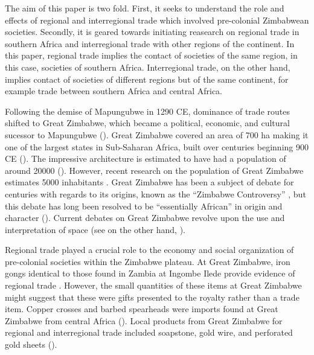 The aim of this paper is two fold. First, it seeks to understand the role and effects of regional and interregional trade which involved pre-colonial Zimbabwean societies. Secondly, it is geared towards initiating reasearch on regional trade in southern Africa and interregional trade with other regions of the continent. In this paper, regional trade implies the contact of societies of the same region, in this case, societies of southern Africa. Interregional trade, on the other hand, implies contact of societies of different regions but of the same continent, for example trade between southern Africa and central Africa.


Following the demise of Mapungubwe in 1290 CE, dominance of trade routes shifted to Great Zimbabwe, which became a political, economic, and cultural sucessor to Mapungubwe (\cites{pikirayi1993}{pwiti2005}{manyanga2006}). Great Zimbabwe covered an area of 700 ha making it one of the largest states in Sub-Saharan Africa, built over centuries beginning 900 CE (\cites{sinclair1993}{ndoro1997}{ndoro2001}).
The impressive architecture is estimated to have had a population of around \num{20000} (\cites{garlake1973}{hall1990}{kim2008}). However, recent research on the population of Great Zimbabwe estimates 5000 inhabitants \parencite{chirikure2017}.
Great Zimbabwe has been a subject of debate for centuries with regards to its origins, known as the \enquote{Zimbabwe Controversy} \parencite{tangri1990},
but this debate has long been resolved to be \enquote{essentially African} in origin and character (\cites{randall1906}{ndoro1997}). Current debates on Great Zimbabwe revolve upon the use and interpretation of space
(see \cites{huffman1984a}{huffman1984b}{huffman1996}{huffman2010}{huffman2014}
on the other hand, \cites{beach1998}{chirikure2008}{pikirayi2011}{chirikure2013socio}).

Regional trade played a crucial role to the economy and social organization of pre-colonial societies within the Zimbabwe plateau. At Great Zimbabwe, iron gongs identical to those found in Zambia at Ingombe Ilede provide evidence of regional trade \parencite{garlake1973}. However, the small quantities of these items at Great Zimbabwe might suggest that these were gifts presented to the royalty rather than a trade item. Copper crosses and barbed spearheads were imports found at Great Zimbabwe from central Africa (\cites{pikirayi2006}{pikirayi2017}). Local products from Great Zimbabwe for regional and interregional trade included soapstone, gold wire, and perforated gold sheets (\cites{garlake1973}{pikirayi2006}{pikirayi2017}).

